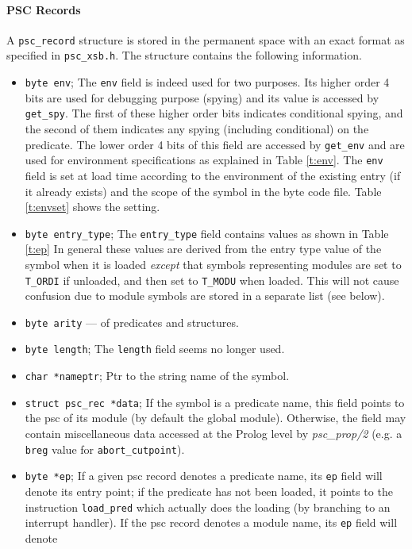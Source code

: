 \documentclass[11pt]{article}
\begin{document}
\paragraph*{PSC Records}
A {\tt psc\_record} structure is stored in the permanent space with an
exact format as specified in {\tt psc\_xsb.h}.  The structure contains
the following information.
%
\begin{itemize}
\item {\tt byte env}; The {\tt env} field is indeed used for two
purposes. Its higher order 4 bits are used for debugging purpose
(spying) and its value is accessed by {\tt get\_spy}.  The first of
these higher order bits indicates conditional spying, and the second
of them indicates any spying (including conditional) on the predicate.
The lower order 4 bits of this field are accessed by {\tt get\_env}
and are used for environment specifications as explained in Table
\ref{t:env}.  The {\tt env} field is set at load time according to the
environment of the existing entry (if it already exists) and the scope
of the symbol in the byte code file.  Table \ref{t:envset} shows the
setting.
%
\item {\tt byte entry\_type}; The {\tt entry\_type} field contains
values as shown in Table \ref{t:ep} In general these values are
derived from the entry type value of the symbol when it is loaded {\em
except} that symbols representing modules are set to {\tt T\_ORDI} if
unloaded, and then set to {\tt T\_MODU} when loaded.  This will not
cause confusion due to module symbols are stored in a separate list
(see below).
%
\item {\tt byte arity} --- of predicates and structures.
%
\item {\tt byte length}; The {\tt length} field seems no longer used.
%
\item   {\tt char *nameptr}; Ptr to the string name of the symbol.
%
\item {\tt struct psc\_rec *data}; If the symbol is a predicate name,
this field points to the psc of its module (by default the global
module).  Otherwise, the field may contain miscellaneous data accessed
at the Prolog level by {\em psc\_prop/2} (e.g. a {\tt breg} value for
{\tt abort\_cutpoint}).
%
\item {\tt byte *ep}; If a given psc record denotes a predicate name,
its {\tt ep} field will denote its entry point; if the predicate has
not been loaded, it points to the instruction {\tt load\_pred} which
actually does the loading (by branching to an interrupt handler).  If
the psc record denotes a module name, its {\tt ep} field will denote

\end{itemize}
\end{document}
